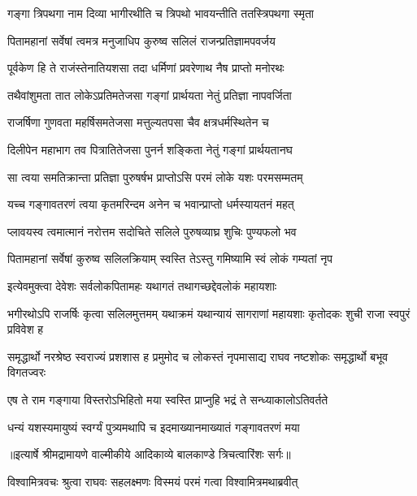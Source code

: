 \twolineshloka
{गङ्गा त्रिपथगा नाम दिव्या भागीरथीति च}
{त्रिपथो भावयन्तीति ततस्त्रिपथगा स्मृता} %

\twolineshloka
{पितामहानां सर्वेषां त्वमत्र मनुजाधिप}
{कुरुष्व सलिलं राजन्प्रतिज्ञामपवर्जय} %

\twolineshloka
{पूर्वकेण हि ते राजंस्तेनातियशसा तदा}
{धर्मिणां प्रवरेणाथ नैष प्राप्तो मनोरथः} %

\twolineshloka
{तथैवांशुमता तात लोकेऽप्रतिमतेजसा}
{गङ्गां प्रार्थयता नेतुं प्रतिज्ञा नापवर्जिता} %

\twolineshloka
{राजर्षिणा गुणवता महर्षिसमतेजसा}
{मत्तुल्यतपसा चैव क्षत्रधर्मस्थितेन च} %

\twolineshloka
{दिलीपेन महाभाग तव पित्रातितेजसा}
{पुनर्न शङ्किता नेतुं गङ्गां प्रार्थयतानघ} %

\twolineshloka
{सा त्वया समतिक्रान्ता प्रतिज्ञा पुरुषर्षभ}
{प्राप्तोऽसि परमं लोके यशः परमसम्मतम्} %

\twolineshloka
{यच्च गङ्गावतरणं त्वया कृतमरिन्दम}
{अनेन च भवान्प्राप्तो धर्मस्यायतनं महत्} %

\twolineshloka
{प्लावयस्व त्वमात्मानं नरोत्तम सदोचिते}
{सलिले पुरुषव्याघ्र शुचिः पुण्यफलो भव} %

\twolineshloka
{पितामहानां सर्वेषां कुरुष्व सलिलक्रियाम्}
{स्वस्ति तेऽस्तु गमिष्यामि स्वं लोकं गम्यतां नृप} %

\twolineshloka
{इत्येवमुक्त्वा देवेशः सर्वलोकपितामहः}
{यथागतं तथागच्छद्देवलोकं महायशाः} %

\threelineshloka
{भगीरथोऽपि राजर्षिः कृत्वा सलिलमुत्तमम्}
{यथाक्रमं यथान्यायं सागराणां महायशाः}
{कृतोदकः शुची राजा स्वपुरं प्रविवेश ह} %

\threelineshloka
{समृद्धार्थो नरश्रेष्ठ स्वराज्यं प्रशशास ह}
{प्रमुमोद च लोकस्तं नृपमासाद्य राघव}
{नष्टशोकः समृद्धार्थो बभूव विगतज्वरः} %

\twolineshloka
{एष ते राम गङ्गाया विस्तरोऽभिहितो मया}
{स्वस्ति प्राप्नुहि भद्रं ते सन्ध्याकालोऽतिवर्तते} %

\twolineshloka
{धन्यं यशस्यमायुष्यं स्वर्ग्यं पुत्र्यमथापि च}
{इदमाख्यानमाख्यातं गङ्गावतरणं मया} %


{॥इत्यार्षे श्रीमद्रामायणे वाल्मीकीये आदिकाव्ये बालकाण्डे त्रिचत्वारिंशः सर्गः॥}


\twolineshloka
{विश्वामित्रवचः श्रुत्वा राघवः सहलक्ष्मणः}
{विस्मयं परमं गत्वा विश्वामित्रमथाब्रवीत्} %

